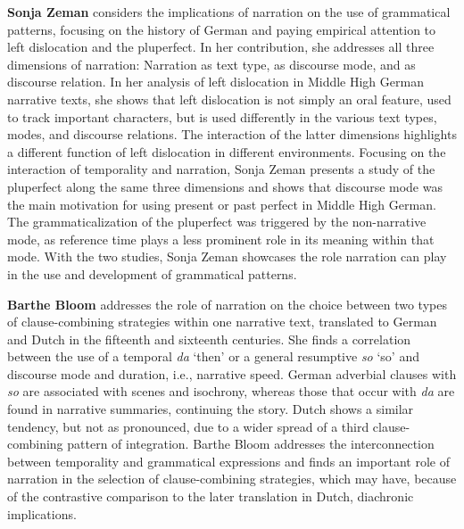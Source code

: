 \documentclass[output=paper,colorlinks,citecolor=brown]{langscibook}
\begin{document}
\bigskip
\noindent
\textbf{Sonja Zeman} considers the implications of narration on the use of grammatical patterns, focusing on the history of German and paying empirical attention to left dislocation and the pluperfect. In her contribution, she addresses all three dimensions of narration: Narration as text type, as discourse mode, and as discourse relation. In her analysis of left dislocation in Middle High German narrative texts, she shows that left dislocation is not simply an oral feature, used to track important characters, but is used differently in the various text types, modes, and discourse relations. The interaction of the latter dimensions highlights a different function of left dislocation in different environments. Focusing on the interaction of temporality and narration, Sonja Zeman presents a study of the pluperfect along the same three dimensions and shows that discourse mode was the main motivation for using present or past perfect in Middle High German. The grammaticalization of the pluperfect was triggered by the non-narrative mode, as reference time plays a less prominent role in its meaning within that mode. With the two studies, Sonja Zeman showcases the role narration can play in the use and development of grammatical patterns.

\bigskip
\noindent
\textbf{Barthe Bloom} addresses the role of narration on the choice between two types of clause-combining strategies within one narrative text, translated to German and Dutch in the fifteenth and sixteenth centuries. She finds a correlation between the use of a temporal \textit{da} `then' or a general resumptive \textit{so} `so' and discourse mode and duration, i.e., narrative speed. German adverbial clauses with \textit{so} are associated with scenes and isochrony, whereas those that occur with \textit{da} are found in narrative summaries, continuing the story. Dutch shows a similar tendency, but not as pronounced, due to a wider spread of a third clause-combining pattern of integration. Barthe Bloom addresses the interconnection between temporality and grammatical expressions and finds an important role of narration in the selection of clause-combining strategies, which may have, because of the contrastive comparison to the later translation in Dutch, diachronic implications.
\end{document}
